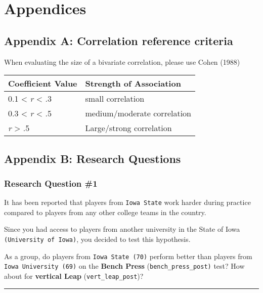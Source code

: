 \documentclass[
]{article}
\begin{document}
\hypertarget{appendices}{%
\section{Appendices}\label{appendices}}

\hypertarget{appendix-a}{%
\subsection{Appendix A: Correlation reference criteria}\label{appendix-a}}

When evaluating the size of a bivariate correlation, please use Cohen (1988)

\begin{longtable}[]{@{}ll@{}}
\toprule
Coefficient Value & Strength of Association \\
\midrule
\endhead
0.1 \textless{} \emph{r} \textless{} .3 & small correlation \\
0.3 \textless{} \emph{r} \textless{} .5 & medium/moderate correlation \\
\emph{r} \textgreater{} .5 & Large/strong correlation \\
\bottomrule
\end{longtable}

\hypertarget{appendix-b}{%
\subsection{Appendix B: Research Questions}\label{appendix-b}}

\hypertarget{research-question-1}{%
\subsubsection{Research Question \#1}\label{research-question-1}}

It has been reported that players from \texttt{Iowa\ State} work harder during practice compared to players from any other college teams in the country.

Since you had access to players from another university in the State of Iowa \texttt{(University\ of\ Iowa)}, you decided to test this hypothesis.

As a group, do players from \texttt{Iowa\ State\ (70)} perform better than players from \texttt{Iowa\ University\ (69)} on the \textbf{Bench Press} (\texttt{bench\_press\_post)} test? How about for \textbf{vertical Leap} (\texttt{vert\_leap\_post})?

\begin{center}\rule{0.5\linewidth}{0.5pt}\end{center}
\end{document}
